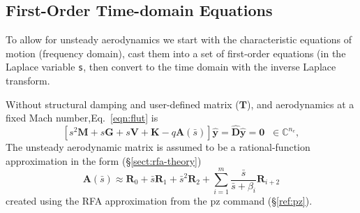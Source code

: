 \documentclass[11pt,openany,twoside]{book}
\numberwithin{equation}{section}		%
\newcommand{\Cmd}[1]{{\sf #1}}
\newcommand{\Code}[1]{{\small\tt #1}}
\newcommand{\Matrix}[1]{\boldsymbol{#1}}
\newcommand{\Vector}[1]{\boldsymbol{#1}}
\newcommand{\Sectref}[1]{\S\ref{#1}}
\newcommand{\Eqn}[1]{Eq.\ \ref{#1}}  %
\begin{document}
\subsection{First-Order Time-domain Equations}\label{sect:statespace}
To allow for unsteady aerodynamics
we start with the characteristic equations of motion
(frequency domain), cast them into a set of first-order equations
(in the Laplace variable \Code{s}, then convert to the time domain with the inverse
Laplace transform.

Without structural damping and user-defined matrix ($\Matrix{T}$),
and aerodynamics at a fixed Mach number,\Eqn{eqn:flut} is
\begin{equation}
	\left[ s^2 \Matrix{M} + s \Matrix{G} + s \Matrix{V} +
		\Matrix{K} - q \Matrix{A} (\bar{s}) \right] \hat{\Vector{y}}
		= \hat{\Matrix{D}}\hat{\Vector{y}} = \Vector{0} \; \; \in \mathbb{C}^{n_e}, \nonumber
\end{equation}
The unsteady aerodynamic matrix is assumed to be a rational-function approximation
in the form (\Sectref{sect:rfa-theory})
\begin{equation}
\Matrix{A}(\bar{s}) \approx \Matrix{R}_0 + \bar{s}\Matrix{R}_1 + \bar{s}^2 \Matrix{R}_2 +  \sum_{i=1}^{m} \frac{\bar{s}}{\bar{s} + \beta_i} \Matrix{R}_{i+2}	\nonumber
\end{equation}
created using the RFA approximation from the \Cmd{pz} command (\Sectref{ref:pz}).
\end{document}
